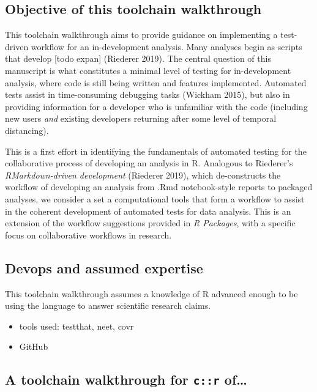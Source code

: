 \documentclass[
]{article}
\providecommand{\tightlist}{%
  \setlength{\itemsep}{0pt}\setlength{\parskip}{0pt}}
\begin{document}
\hypertarget{objective-of-this-toolchain-walkthrough}{%
\subsection{Objective of this toolchain walkthrough}\label{objective-of-this-toolchain-walkthrough}}

This toolchain walkthrough aims to provide guidance on implementing a test-driven workflow for an in-development analysis. Many analyses begin as scripts that develop {[}todo expan{]} (Riederer 2019). The central question of this manuscript is what constitutes a minimal level of testing for in-development analysis, where code is still being written and features implemented. Automated tests assist in time-consuming debugging tasks (Wickham 2015), but also in providing information for a developer who is unfamiliar with the code (including new users \emph{and} existing developers returning after some level of temporal distancing).

This is a first effort in identifying the fundamentals of automated testing for the collaborative process of developing an analysis in R. Analogous to Riederer's \emph{RMarkdown-driven development} (Riederer 2019), which de-constructs the workflow of developing an analysis from .Rmd notebook-style reports to packaged analyses, we consider a set a computational tools that form a workflow to assist in the coherent development of automated tests for data analysis. This is an extension of the workflow suggestions provided in \emph{R Packages}, with a specific focus on collaborative workflows in research.

\hypertarget{devops-and-assumed-expertise}{%
\subsection{Devops and assumed expertise}\label{devops-and-assumed-expertise}}

This toolchain walkthrough assumes a knowledge of R advanced enough to be using the language to answer scientific research claims.

\begin{itemize}
\tightlist
\item
  tools used: testthat, neet, covr
\item
  GitHub
\end{itemize}

\hypertarget{a-toolchain-walkthrough-for-cr-of}{%
\subsection{\texorpdfstring{A toolchain walkthrough for \texttt{c::r} of\ldots{}}{A toolchain walkthrough for c::r of\ldots{}}}\label{a-toolchain-walkthrough-for-cr-of}}
\end{document}
